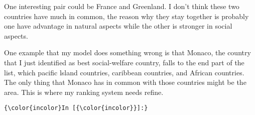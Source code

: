 \documentclass{article}
\begin{document}
One interesting pair could be France and Greenland. I don't think these
two countries have much in common, the reason why they stay together is
probably one have advantage in natural aspects while the other is
stronger in social aspects.

One example that my model does something wrong is that Monaco, the
country that I just identified as best social-welfare country, falls to
the end part of the list, which pacific lsland countries, caribbean
countries, and African countries. The only thing that Monaco has in
common with those countries might be the area. This is where my ranking
system needs refine.

    \begin{Verbatim}[commandchars=\\\{\}]
{\color{incolor}In [{\color{incolor}}]:} 
\end{Verbatim}


    
    
    
    
\end{document}
